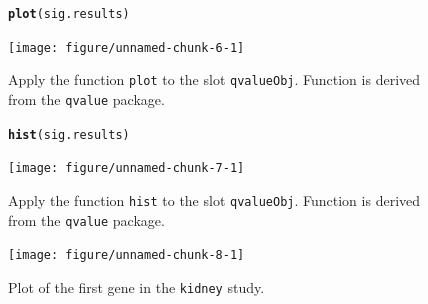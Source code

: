\documentclass{article}\usepackage[]{graphicx}\usepackage[]{color}
\makeatletter
\newcommand{\hlstd}[1]{\textcolor[rgb]{0.345,0.345,0.345}{#1}}%
\newcommand{\hlkwd}[1]{\textcolor[rgb]{0.737,0.353,0.396}{\textbf{#1}}}%
\newenvironment{kframe}{%
 \def\at@end@of@kframe{}%
 \ifinner\ifhmode%
  \def\at@end@of@kframe{\end{minipage}}%
  \begin{minipage}{\columnwidth}%
 \fi\fi%
 \def\FrameCommand##1{\hskip\@totalleftmargin \hskip-\fboxsep
 \colorbox{shadecolor}{##1}\hskip-\fboxsep
     \hskip-\linewidth \hskip-\@totalleftmargin \hskip\columnwidth}%
 \MakeFramed {\advance\hsize-\width
   \@totalleftmargin\z@ \linewidth\hsize
   \@setminipage}}%
 {\par\unskip\endMakeFramed%
 \at@end@of@kframe}
\newenvironment{knitrout}{}{} %
\makeatother
\begin{document}
\begin{figure}[!htbp]
 \centering
\begin{knitrout}
\color{fgcolor}\begin{kframe}
\begin{alltt}
\hlkwd{plot}\hlstd{(sig.results)}
\end{alltt}
\end{kframe}

{\centering \texttt{[image: figure/unnamed-chunk-6-1]} 

}



\end{knitrout}
\caption{Apply the function {\tt plot} to the slot {\tt qvalueObj}. Function is derived from the {\tt qvalue} package.}
\label{fig:gqvalPlot}
\end{figure}
\begin{figure}[!htbp]
 \centering
\begin{knitrout}
\color{fgcolor}\begin{kframe}
\begin{alltt}
\hlkwd{hist}\hlstd{(sig.results)}
\end{alltt}
\end{kframe}

{\centering \texttt{[image: figure/unnamed-chunk-7-1]} 

}



\end{knitrout}
\caption{Apply the function {\tt hist} to the slot {\tt qvalueObj}. Function is derived from the {\tt qvalue} package.}
\label{fig:gqvalHist}
\end{figure}



\begin{figure}[!htbp]
 \centering
\begin{knitrout}
\color{fgcolor}

{\centering \texttt{[image: figure/unnamed-chunk-8-1]} 

}



\end{knitrout}
\caption{Plot of the first gene in the {\tt kidney} study.}
\label{fig:kplot}
\end{figure}
\end{document}
